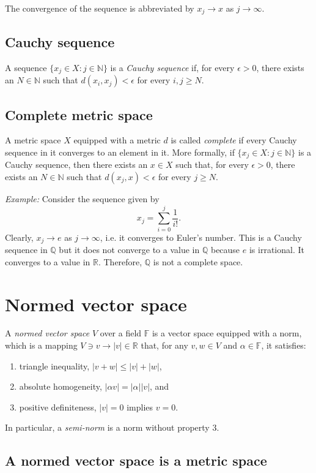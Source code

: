 \documentclass[aps,prl,twocolumn,groupedaddress]{revtex4-2}
\newcommand{\FF}{\mathbb{F}}
\newcommand{\NN}{\mathbb{N}}
\newcommand{\QQ}{\mathbb{Q}}
\newcommand{\RR}{\mathbb{R}}
\begin{document}
The convergence of the sequence is abbreviated by $x_j\to x$ as $j\to \infty$.

\subsection{Cauchy sequence}

A sequence $\{x_j\in X:j\in \NN\}$ is a {\em Cauchy sequence} if, for every $\epsilon>0$, there exists an $N\in \NN$ such that $d(x_i,x_j)<\epsilon$ for every $i,j\geq N$.

\subsection{Complete metric space}

A metric space $X$ equipped with a metric $d$ is called {\em complete} if every Cauchy sequence in it converges to an element in it.
More formally, if $\{x_j\in X:j\in \NN\}$ is a Cauchy sequence, then there exists an $x\in X$ such that, for every $\epsilon>0$, there exists an $N\in \NN$ such that $d(x_j,x)<\epsilon$ for every $j\geq N$.

{\em Example:}
Consider the sequence given by
$$
x_j = \sum_{i=0}^j \frac{1}{i!}.
$$
Clearly, $x_j\to e$ as $j\to \infty$, i.e. it converges to Euler's number.
This is a Cauchy sequence in $\QQ$ but it does not converge to a value in $\QQ$ because $e$ is irrational.
It converges to a value in $\RR$.
Therefore, $\QQ$ is not a complete space.

\section{Normed vector space}

A {\em normed vector space} $V$ over a field $\FF$ is a vector space equipped with a norm, which is a mapping $V\ni v\to |v|\in \RR$ that, for any $v,w\in V$ and $\alpha\in \FF$, it satisfies:
\begin{enumerate}
\item triangle inequality, $|v+w|\leq |v|+|w|$,
\item absolute homogeneity, $|\alpha v|=|\alpha||v|$, and
\item positive definiteness, $|v|=0$ implies $v=0$.
\end{enumerate}
In particular, a {\em semi-norm} is a norm without property 3.

\subsection{A normed vector space is a metric space}
\end{document}
